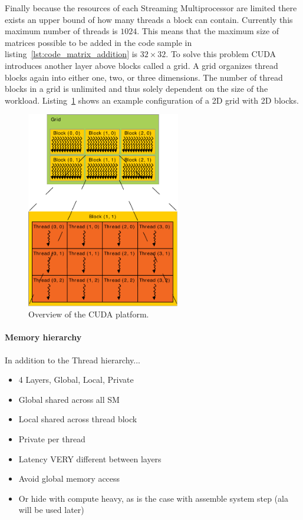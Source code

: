 \documentclass[a4paper,11pt]{kth-mag}
\begin{document}
Finally because the resources of each Streaming Multiprocessor are limited there exists an upper bound of how many threads a block can contain. Currently this maximum number of threads is $1024$. This means that the maximum size of matrices possible to be added in the code sample in listing~\ref{lst:code_matrix_addition} is $32\times32$. To solve this problem CUDA introduces another layer above blocks called a grid. A grid organizes thread blocks again into either one, two, or three dimensions. The number of thread blocks in a grid is unlimited and thus solely dependent on the size of the workload. Listing~\ref{fig:grid_blocks} shows an example configuration of a 2D grid with 2D blocks.

\begin{figure}[!htbp]
  \centering
  \includegraphics[width=0.6\textwidth]{img/grid_blocks.pdf}
  \caption{Overview of the CUDA platform.}
  \label{fig:grid_blocks}
\end{figure}

\paragraph{Memory hierarchy}

In addition to the Thread hierarchy...

\begin{itemize}
\item 4 Layers, Global, Local, Private
\item Global shared across all SM
\item Local shared across thread block
\item Private per thread
\item Latency VERY different between layers
\item Avoid global memory access
\item Or hide with compute heavy, as is the case with assemble system step (ala will be used later)
\end{itemize}
\end{document}
